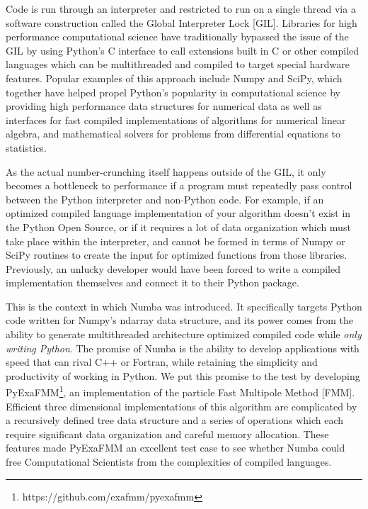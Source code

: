 \documentclass{IEEEcsmag}
\begin{document}
Code is run through an interpreter and restricted to run on a single thread via a software construction called the Global Interpreter Lock [GIL]. Libraries for high performance computational science have traditionally bypassed the issue of the GIL by using Python's C interface to call extensions built in C or other compiled languages which can be multithreaded and compiled to target special hardware features. Popular examples of this approach include Numpy and SciPy, which together have helped propel Python's popularity in computational science by providing high performance data structures for numerical data as well as interfaces for fast compiled implementations of algorithms for numerical linear algebra, and mathematical solvers for problems from differential equations to statistics.

As the actual number-crunching itself happens outside of the GIL, it only becomes a bottleneck to performance if a program must repeatedly pass control between the Python interpreter and non-Python code. For example, if an optimized compiled language implementation of your algorithm doesn't exist in the Python Open Source, or if it requires a lot of data organization which must take place within the interpreter, and cannot be formed in terms of Numpy or SciPy routines to create the input for optimized functions from those libraries. Previously, an unlucky developer would have been forced to write a compiled implementation themselves and connect it to their Python package.

This is the context in which Numba was introduced. It specifically targets Python code written for Numpy's ndarray data structure, and its power comes from the ability to generate multithreaded architecture optimized compiled code while \textit{only writing Python}. The promise of Numba is the ability to develop applications with speed that can rival C++ or Fortran, while retaining the simplicity and productivity of working in Python. We put this promise to the test by developing PyExaFMM\footnote{https://github.com/exafmm/pyexafmm}, an implementation of the particle Fast Multipole Method [FMM]. Efficient three dimensional implementations of this algorithm are complicated by a recursively defined tree data structure and a series of operations which each require significant data organization and careful memory allocation. These features made PyExaFMM an excellent test case to see whether Numba could free Computational Scientists from the complexities of compiled languages.
\end{document}
